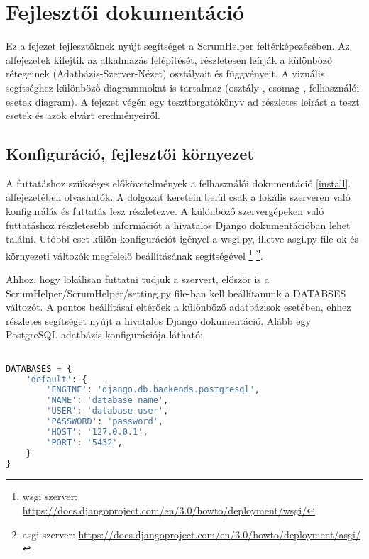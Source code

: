 \chapter{Fejlesztői dokumentáció} %
\label{ch:impl}

Ez a fejezet fejlesztőknek nyújt segítséget a ScrumHelper feltérképezésében. Az alfejezetek kifejtik az alkalmazás felépítését, részletesen leírják a különböző rétegeinek (Adatbázis-Szerver-Nézet) osztályait és függvényeit. A vizuális segítséghez különböző diagrammokat is tartalmaz (osztály-, csomag-, felhasználói esetek diagram). A fejezet végén egy tesztforgatókönyv ad részletes leírást a teszt esetek és azok elvárt eredményeiről.

\section{Konfiguráció, fejlesztői környezet}
\label{config}

A futtatáshoz szükséges előkövetelmények a felhasználói dokumentáció \ref{install}. alfejezetében olvashatók. A dolgozat keretein belül csak a lokális szerveren való konfigurálás és futtatás lesz részletezve. A különböző szervergépeken való futtatáshoz részletesebb információt a hivatalos Django dokumentációban lehet találni. Utóbbi eset külön konfigurációt igényel a wsgi.py, illetve asgi.py file-ok és környezeti változók megfelelő beállításának segítségével \footnote{wsgi szerver: \url{https://docs.djangoproject.com/en/3.0/howto/deployment/wsgi/}} \footnote{asgi szerver: \url{https://docs.djangoproject.com/en/3.0/howto/deployment/asgi/}}.  

Ahhoz, hogy lokálisan futtatni tudjuk a szervert, először is a ScrumHelper/ScrumHelper/setting.py file-ban kell beállítanunk a DATABSES változót. A pontos beállításai eltérőek a különböző adatbázisok esetében, ehhez részletes segítséget nyújt a hivatalos Django dokumentáció. Alább  egy PostgreSQL adatbázis konfigurációja látható:

\begin{lstlisting}[language={python}]

DATABASES = {
    'default': {
        'ENGINE': 'django.db.backends.postgresql',
        'NAME': 'database name',
        'USER': 'database user',
        'PASSWORD': 'password',
        'HOST': '127.0.0.1',
        'PORT': '5432',
    }
}

\end{lstlisting}

